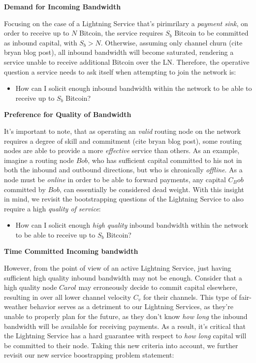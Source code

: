 \documentclass[12pt,a4paper]{article}
\theoremstyle{definition}
\begin{document}
\begin{center}
	\textbf{Demand for Incoming Bandwidth}
\end{center}

Focusing on the case of a Lightning Service that's pirimrilary a \emph{payment
sink}, on order to receive up to $N$ Bitcoin, the service requires $S_b$
Bitcoin to be committed as inbound capital, with $S_b > N$. Otherwise, assuming
only channel churn (cite bryan blog post), all inbound bandwidth will become
saturated, rendering a service unable to receive additional Bitcoin over the
LN. Therefore, the operative question a service needs to ask itself when
attempting to join the network is: 

\begin{itemize}
        \item How can I solicit enough inbound bandwidth within the network to
            be able to receive up to $S_b$ Bitcoin? 
\end{itemize}


\begin{center}
	\textbf{Preference for Quality of Bandwidth}
\end{center}

It's important to note, that as operating an \emph{valid} routing node on the
network requires a degree of skill and commitment (cite bryan blog post), some
routing nodes are able to provide a more \emph{effective} service than others.
As an example, imagine a routing node $Bob$, who has sufficient capital
committed to his not in both the inbound and outbound directions, but who is
chronically \emph{offline}. As a node must be \emph{online} in order to be able
to forward payments, any capital $C_Bob$ committed by $Bob$, can essentially be
considered dead weight. With this insight in mind, we revisit the bootstrapping
questions of the Lightning Service to also require a high \emph{quality of
service}:

\begin{itemize}
        \item How can I solicit enough \emph{high quality} inbound bandwidth
            within the network to be able to receive up to $S_b$ Bitcoin? 
\end{itemize}

\begin{center}
	\textbf{Time Committed Incoming bandwidth}
\end{center}


However, from the point of view of an active Lightning Service, just having
sufficient high quality inbound bandwidth may not be enough. Consider that a
high quality node $Carol$ may erroneously decide to commit capital elsewhere,
resulting in over all lower channel velocity $C_v$ for their channels. This
type of fair-weather behavior serves as a detriment to our Lightning Services,
as they're unable to properly plan for the future, as they don't know \emph{how
long} the inbound bandwidth will be available for receiving payments. As a
result, it's critical that the Lightning Service has a hard guarantee with
respect to \emph{how long} capital will be committed to their node. Taking this
new criteria into account, we further revisit our new service boostrapping
problem statement: 
\end{document}

